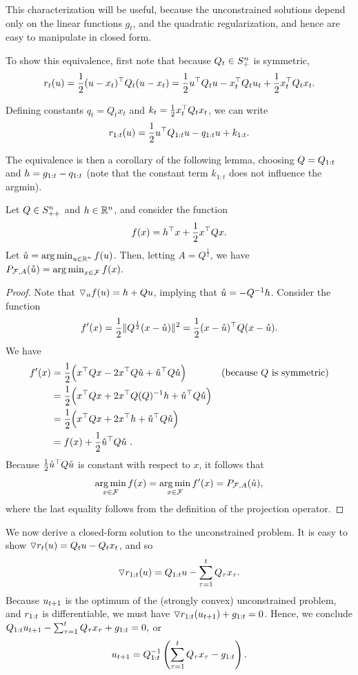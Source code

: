 This characterization will be useful, because the unconstrained
solutions depend only on the linear functions $g_t$, and the quadratic
regularization, and hence are easy to manipulate in closed form.

To show this equivalence, first note that because $Q_t \in S^n_{+}$ is symmetric,
\[ r_t(u) = \frac{1}{2} (u - x_t)^\top Q_t(u - x_t) 
          = \frac{1}{2} u^\top Q_t u - x_t^\top Q_tu_t + \frac{1}{2} x_t^\top Q_tx_t.\]

Defining
constants $q_t = Q_t x_t$ and $k_t = \frac{1}{2} x_t^\top Q_tx_t $, we can
write
\begin{equation}\label{eq:rtt}
 r_{1:t}(u) = \frac{1}{2} u^\top Q_{1:t} u - q_{1:t} u + k_{1:t}.
\end{equation}


The equivalence is then a corollary of the following lemma,
choosing $Q = Q_{1:t}$ and $h = g_{1:t} - q_{1:t}$ (note that the
constant term $k_{1:t}$ does not influence the argmin).
\begin{lemma}\label{lem:lazy_proj} 
Let $Q \in S^n_{++}$ and $h \in \mathbb{R}^n$, and consider the function
\[ f(x) = h^\top x + \frac{1}{2}x^\top Qx.\]
Let $\mathring{u} = \mathop{\rm arg\,min}_{u \in \mathbb{R}^n} f(u)$.  Then, letting $A = Q^{\frac{1}{2}}$, we have
$P_{\mathcal{F},A}(\mathring{u}) = \mathop{\rm arg\,min}_{x \in \mathcal{F}} f(x).$
\end{lemma}

\begin{proof}
Note that $\triangledown_u f(u) = h + Qu$, implying that $\mathring{u} = -Q^{-1}h$.
Consider the function 
\[f'(x) = \frac{1}{2}\| Q^{\frac{1}{2}}(x - \mathring{u}) \|^2 
        = \frac{1}{2}(x - \mathring{u})^\top Q(x - \mathring{u}).\]
We have
\begin{align*}
f'(x) &= %
 \frac{1}{2}\Big(x^\tp Qx - 2 x^\tp Q \us + \us^\tp Q\us\Big) & \text{(because $Q$ is symmetric)} \\
 &= \frac{1}{2}\Big(x^\tp Qx + 2 x^\tp Q (Q)^{-1}h + \us^\tp Q \us \Big) \\
 &= \frac{1}{2}\Big(x^\tp Qx + 2 x^\tp h + \us^\tp Q \us \Big) \\
 &= f(x) + \frac{1}{2}\us^\tp Q \us \mbox { .} 
\end{align*}
Because $\frac{1}{2} \mathring{u}^\top Q \mathring{u}$ is constant with respect to $x$, it
follows that
\[
\mathop{\rm arg\,min}_{x \in \mathcal{F}} f(x) = \mathop{\rm arg\,min}_{x \in \mathcal{F}} f'(x) =P_{\mathcal{F},A}(\mathring{u}),
\]
where the last equality follows from the definition of the projection operator.
\end{proof}

We now derive a closed-form solution to the unconstrained problem.  It
is easy to show $\triangledown r_t(u) = Q_tu - Q_tx_t$, and so
\[\triangledown r_{1:t}(u) = Q_{1:t} u - \sum_{\tau=1}^tQ_\tau x_\tau.\]
Because $u_{t+1}$ is the optimum of the (strongly convex) unconstrained problem,
and $r_{1:t}$
is differentiable,
we must have $\triangledown
r_{1:t}(u_{t+1}) + g_{1:t} = 0$.  Hence, we conclude
$Q_{1:t} u_{t+1} - \sum_{\tau=1}^tQ_\tau x_\tau + g_{1:t} = 0,$
or
\begin {equation} \label {eq:unconstrained_opt}
u_{t+1} = Q_{1:t}^{-1}\left(\sum_{\tau=1}^tQ_\tau x_\tau - g_{1:t}\right).
\end {equation}

